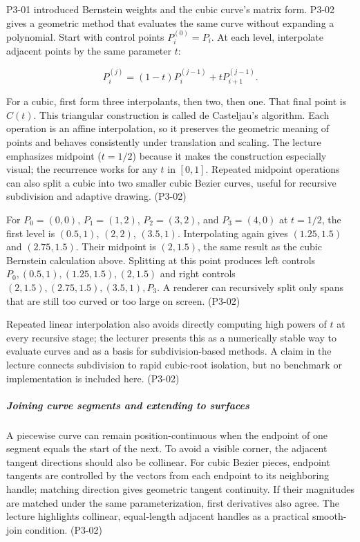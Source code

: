 P3-01 introduced Bernstein weights and the cubic curve's matrix form. P3-02 gives a geometric method that evaluates the same curve without expanding a polynomial. Start with control points \(P_i^{(0)}=P_i\). At each level, interpolate adjacent points by the same parameter \(t\):

\[
P_i^{(j)}=(1-t)P_i^{(j-1)}+tP_{i+1}^{(j-1)}.
\]

For a cubic, first form three interpolants, then two, then one. That final point is \(C(t)\). This triangular construction is called de Casteljau's algorithm. Each operation is an affine interpolation, so it preserves the geometric meaning of points and behaves consistently under translation and scaling. The lecture emphasizes midpoint (\(t=1/2\)) because it makes the construction especially visual; the recurrence works for any \(t\) in \([0,1]\). Repeated midpoint operations can also split a cubic into two smaller cubic Bezier curves, useful for recursive subdivision and adaptive drawing. (P3-02)

For \(P_0=(0,0)\), \(P_1=(1,2)\), \(P_2=(3,2)\), and \(P_3=(4,0)\) at \(t=1/2\), the first level is \((0.5,1)\), \((2,2)\), \((3.5,1)\). Interpolating again gives \((1.25,1.5)\) and \((2.75,1.5)\). Their midpoint is \((2,1.5)\), the same result as the cubic Bernstein calculation above. Splitting at this point produces left controls \(P_0,(0.5,1),(1.25,1.5),(2,1.5)\) and right controls \((2,1.5),(2.75,1.5),(3.5,1),P_3\). A renderer can recursively split only spans that are still too curved or too large on screen. (P3-02)

Repeated linear interpolation also avoids directly computing high powers of \(t\) at every recursive stage; the lecturer presents this as a numerically stable way to evaluate curves and as a basis for subdivision-based methods. A claim in the lecture connects subdivision to rapid cubic-root isolation, but no benchmark or implementation is included here. (P3-02)

\subparagraph{Joining curve segments and extending to surfaces}\label{03-visual-computing-i-ch001-joining-curve-segments-and-extending-to-surfaces}

\hypertarget{03-visual-computing-i-ch001-joining-curve-segments-and-extending-to-surfaces}{}

A piecewise curve can remain position-continuous when the endpoint of one segment equals the start of the next. To avoid a visible corner, the adjacent tangent directions should also be collinear. For cubic Bezier pieces, endpoint tangents are controlled by the vectors from each endpoint to its neighboring handle; matching direction gives geometric tangent continuity. If their magnitudes are matched under the same parameterization, first derivatives also agree. The lecture highlights collinear, equal-length adjacent handles as a practical smooth-join condition. (P3-02)


